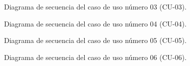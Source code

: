 \begin{figure}[htbp!]
	\begin{center}
		\caption{Diagrama de secuencia del caso de uso número 03 (CU-03).}
		\label{fig:Diagrama se secuencia CU-03}
	\end{center}
\end{figure}

\begin{figure}[htbp!]
	\begin{center}
		\caption{Diagrama de secuencia del caso de uso número 04 (CU-04).}
		\label{fig:Diagrama de secuencia CU-04}
	\end{center}
\end{figure}

\begin{figure}[htbp!]
	\begin{center}
		\caption{Diagrama de secuencia del caso de uso número 05 (CU-05).}
		\label{fig:Diagrama de secuencia CU-05}
	\end{center}
\end{figure}

\begin{figure}[htbp!]
	\begin{center}
		\caption{Diagrama de secuencia del caso de uso número 06 (CU-06).}
		\label{fig:Diagrama de secuencia CU-06}
	\end{center}
\end{figure}

